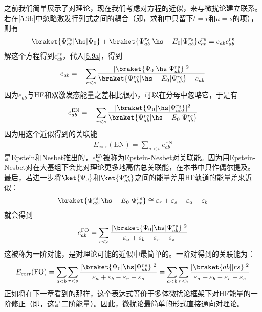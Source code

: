 之前我们简单展示了对理论，现在我们考虑对方程的近似，来与微扰论建立联系。若在\autoref{5.9b}中忽略激发行列式之间的耦合（即，求和中只留下$t=r$和$u=s$的项），则有
\begin{align}
    \braket{\Psi^{rs}_{ab}|\hs|\Psi_0}+\braket{\Psi^{rs}_{ab}|\hs-E_0|\Psi^{rs}_{ab}}c^{rs}_{ab}=e_{ab}c^{rs}_{ab}
\end{align}
解这个方程得到$c^{rs}_{ab}$，代入\autoref{5.9a}，得到
\begin{align}
    e_{ab}=-\sum_{r<s}\frac{|\braket{\Psi_0|\hs|\Psi^{rs}_{ab}}|^2}{\braket{\Psi^{rs}_{ab}|\hs-E_0|\Psi^{rs}_{ab}}-e_{ab}}
\end{align}
因为$e_{ab}$与HF和双激发态能量之差相比很小，可以在分母中忽略它，于是有
\begin{align}
    e_{ab}^{\text{EN}}=-\sum_{r<s}\frac{|\braket{\Psi_0|\hs|\Psi^{rs}_{ab}}|^2}{\braket{\Psi^{rs}_{ab}|\hs-E_0|\Psi^{rs}_{ab}}}
\end{align}
因为用这个近似得到的关联能
\begin{align}
    E_\text{corr}(\text{EN})=\sum_{a<b}e_{ab}^{\text{EN}}
\end{align}
是Epstein和Nesbet推出的，$e_{ab}^{\text{EN}}$被称为Epstein-Nesbet对关联能。因为用Epstein-Nesbet对在大基组下会比对理论更多地高估总关联能，在本书中只作偶尔提及。
最后，若进一步将$\ket{\Psi_0}$和$\ket{\Psi^{rs}_{ab}}$之间的能量差用HF轨道的能量差来近似：
\begin{align}
    \braket{\Psi^{rs}_{ab}|\hs-E_0|\Psi^{rs}_{ab}}\cong \varepsilon_r+\varepsilon_s-\varepsilon_a-\varepsilon_b
\end{align}
就会得到
\begin{align}
    e_{ab}^{\text{FO}}=\sum_{r<s}\frac{|\braket{\Psi_0|\hs|\Psi^{rs}_{ab}}|^2}{\varepsilon_a+\varepsilon_b-\varepsilon_r-\varepsilon_s}
\end{align}
这被称为一阶对能，是对理论可能的近似中最简单的。一阶对得到的关联能为：
\begin{align}
    \label{5.19}
    E_\text{corr}(\text{FO})=\sum_{a<b}\sum_{r<s}\frac{|\braket{\Psi_0|\hs|\Psi^{rs}_{ab}}|^2}{\varepsilon_a+\varepsilon_b-\varepsilon_r-\varepsilon_s}
    =\sum_{a<b}\sum_{r<s}\frac{|\braket{ab||rs}|^2}{\varepsilon_a+\varepsilon_b-\varepsilon_r-\varepsilon_s}
\end{align}
正如将在下一章看到的那样，这个表达式等价于多体微扰论框架下对HF能量的一阶修正（即，这是二阶能量）。因此，微扰论最简单的形式直接通向对理论。
